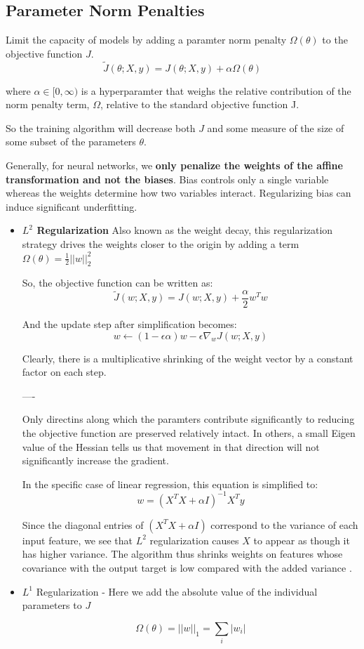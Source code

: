 \documentclass{article}
\begin{document}
\subsection{Parameter Norm Penalties}

Limit the capacity of models by adding a paramter norm penalty $\Omega(\theta)$ to the objective function $J$. 
$$ \tilde{J}(\theta; X, y) = J( \theta; X, y) + \alpha\Omega(\theta) $$

where $ \alpha \in [0, \infty) $ is a hyperparamter that weighs the relative contribution of the norm penalty term, $\Omega$, relative to the standard objective function J.

So the training algorithm will decrease both $J$ and some measure of the size of some subset of the parameters $ \theta$.

Generally, for neural networks, we \textbf{only penalize the weights of the affine transformation and not the biases}. Bias controls only a single variable whereas the weights determine how two variables interact. Regularizing bias can induce significant underfitting.

\begin{itemize}
    \item \textbf{$L^2$ Regularization} Also known as the weight decay, this regularization strategy drives the weights closer to the origin by adding a term $ \Omega(\theta) = \frac{1}{2} || w ||^2_2$
    
    So, the objective function can be written as:
    $$ \tilde{J}(w; X, y) = J(w; X, y) + \frac{\alpha}{2}w^Tw $$
    
    And the update step after simplification becomes:
    $$ w \leftarrow (1 - \epsilon\alpha)w - \epsilon \nabla_wJ(w; X,y) $$
    
    Clearly, there is a multiplicative shrinking of the weight vector by a constant factor on each step.
    
    ----
    
    Only directins along which the paramters contribute significantly to reducing the objective function are preserved relatively intact. In others, a small Eigen value of the Hessian tells us that movement in that direction will not significantly increase the gradient.
    
    In the specific case of linear regression, this equation is simplified to:
    $$ w = (X^TX + \alpha I) ^{-1} X^T y $$
    
    Since the diagonal entries of $ (X^TX + \alpha I)$ correspond to the variance of each input feature, we see that $L^2$ regularization causes $X$ to appear as though it has higher variance. The algorithm thus shrinks weights on features whose covariance with the output target is low compared with the added variance .
    
    \item{$L^1$ Regularization} - Here we add the absolute value of the individual parameters to $J$
    
    $$ \Omega(\theta) = ||w||_1 = \sum_i|w_i| $$
    
    
    
\end{itemize}
\end{document}
